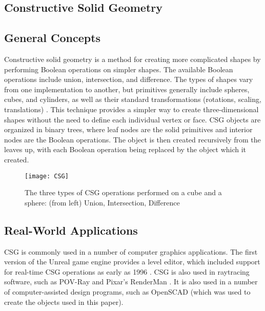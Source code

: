 \documentclass[12pt]{article}
\begin{document}
\begin{doublespace}
\section{Constructive Solid Geometry}
\subsection{General Concepts}
Constructive solid geometry is a method for creating more complicated shapes by performing Boolean operations on simpler shapes. The available Boolean operations include union, intersection, and difference. The types of shapes vary from one implementation to another, but primitives generally include spheres, cubes, and cylinders, as well as their standard transformations (rotations, scaling, translations) \cite{cs_dictionary}. This technique provides a simpler way to create three-dimensional shapes without the need to define each individual vertex or face. CSG objects are organized in binary trees, where leaf nodes are the solid primitives and interior nodes are the Boolean operations. The object is then created recursively from the leaves up, with each Boolean operation being replaced by the object which it created\cite{gold}.

\begin{figure}[h]
  \texttt{[image: CSG]}
  \centering
  \caption{The three types of CSG operations performed on a cube and a sphere: (from left) Union, Intersection, Difference}
\end{figure}
\subsection{Real-World Applications}
CSG is commonly used in a number of computer graphics applications. The first version of the Unreal game engine provides a level editor, which included support for real-time CSG operations as early as 1996 \cite{unreal}. CSG is also used in raytracing software, such as POV-Ray and Pixar's RenderMan \cite{open_csg}. It is also used in a number of computer-assisted design programs, such as OpenSCAD (which was used to create the objects used in this paper).

\end{doublespace}
\end{document}
